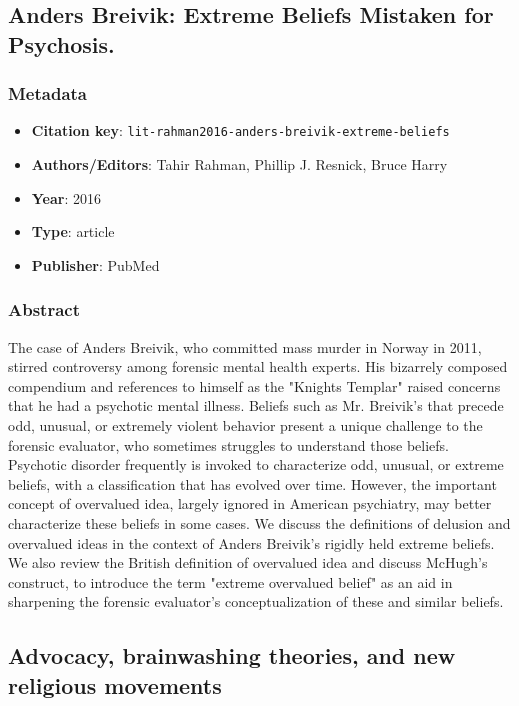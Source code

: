 \subsection{Anders Breivik: Extreme Beliefs Mistaken for Psychosis.}\label{lit:lit-rahman2016-anders-breivik-extreme-beliefs}
\subsubsection*{Metadata}
\begin{itemize}
  \item \textbf{Citation key}: \texttt{lit-rahman2016-anders-breivik-extreme-beliefs}
  \item \textbf{Authors/Editors}: Tahir Rahman, Phillip J. Resnick, Bruce Harry
  \item \textbf{Year}: 2016
  \item \textbf{Type}: article
  \item \textbf{Publisher}: PubMed
\end{itemize}
\subsubsection*{Abstract}
The case of Anders Breivik, who committed mass murder in Norway in 2011, stirred controversy among forensic mental health experts. His bizarrely composed compendium and references to himself as the "Knights Templar" raised concerns that he had a psychotic mental illness. Beliefs such as Mr. Breivik's that precede odd, unusual, or extremely violent behavior present a unique challenge to the forensic evaluator, who sometimes struggles to understand those beliefs. Psychotic disorder frequently is invoked to characterize odd, unusual, or extreme beliefs, with a classification that has evolved over time. However, the important concept of overvalued idea, largely ignored in American psychiatry, may better characterize these beliefs in some cases. We discuss the definitions of delusion and overvalued ideas in the context of Anders Breivik's rigidly held extreme beliefs. We also review the British definition of overvalued idea and discuss McHugh's construct, to introduce the term "extreme overvalued belief" as an aid in sharpening the forensic evaluator's conceptualization of these and similar beliefs.

\subsection{Advocacy, brainwashing theories, and new religious movements}\label{lit:lit-introvigne2014-advocacy-brainwashing-theories-and}
